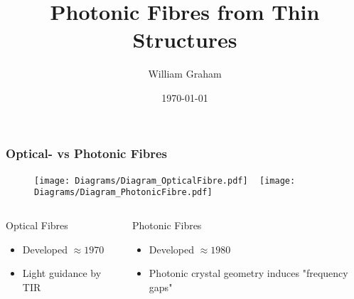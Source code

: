 \documentclass{beamer}
\title{Photonic Fibres from Thin Structures}
\author{William Graham}
\institute{University of Bath}
\date{\today}
\begin{document}
 
\frame{\titlepage}
 

\begin{frame}
	\frametitle{Optical- vs Photonic Fibres}
	
	\begin{figure}[t]
		\centering
		\texttt{[image: Diagrams/Diagram\_OpticalFibre.pdf]}
		~
		\texttt{[image: Diagrams/Diagram\_PhotonicFibre.pdf]}
	\end{figure}
	\begin{columns}
		\begin{column}{0.45\textwidth}
			\begin{block}{Optical Fibres}
				\begin{itemize}
					\item Developed $\approx 1970$
					\item Light guidance by TIR
				\end{itemize}
			\end{block}
		\end{column}
		\begin{column}{0.45\textwidth}
			\begin{block}{Photonic Fibres}
				\begin{itemize}
					\item Developed $\approx 1980$
					\item Photonic crystal geometry induces "frequency gaps"
				\end{itemize}
			\end{block}
		\end{column}
	\end{columns}
\end{frame} 
\end{document}
